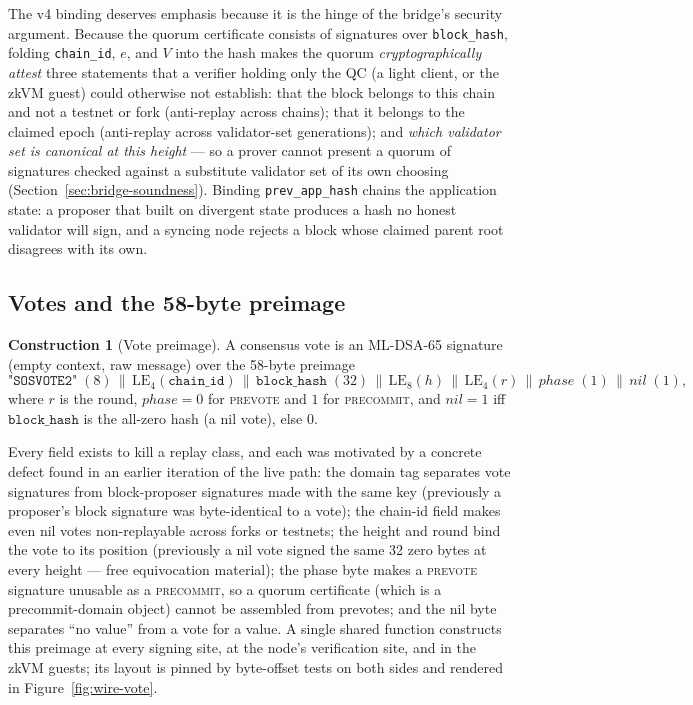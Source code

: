 \documentclass[11pt]{article}
\newcommand{\code}[1]{\texttt{#1}}
\newcommand{\mldsa}{ML\mbox{-}DSA\mbox{-}65}
\newcommand{\LE}[1]{\mathrm{LE}_{#1}}
\newcommand{\concat}{\,\|\,}
\theoremstyle{plain}
\theoremstyle{definition}
\newtheorem{construction}[theorem]{Construction}
\theoremstyle{remark}
\begin{document}
The v4 binding deserves emphasis because it is the hinge of the bridge's
security argument. Because the quorum certificate consists of signatures over
\code{block\_hash}, folding \code{chain\_id}, $e$, and $V$ into the hash makes
the quorum \emph{cryptographically attest} three statements that a verifier
holding only the QC (a light client, or the zkVM guest) could otherwise not
establish: that the block belongs to this chain and not a testnet or fork
(anti-replay across chains); that it belongs to the claimed epoch (anti-replay
across validator-set generations); and \emph{which validator set is canonical
at this height} --- so a prover cannot present a quorum of signatures checked
against a substitute validator set of its own choosing
(Section~\ref{sec:bridge-soundness}). Binding \code{prev\_app\_hash} chains
the application state: a proposer that built on divergent state produces a
hash no honest validator will sign, and a syncing node rejects a block whose
claimed parent root disagrees with its own.

\subsection{Votes and the 58-byte preimage}
\label{sec:votes}

\begin{construction}[Vote preimage]
\label{con:vote}
A consensus vote is an \mldsa{} signature (empty context, raw message) over
the 58-byte preimage
\[
\code{"SOSVOTE2"} \;(8) \concat \LE{4}(\code{chain\_id}) \concat \code{block\_hash} \;(32) \concat
\LE{8}(h) \concat \LE{4}(r) \concat \mathit{phase} \;(1) \concat
\mathit{nil} \;(1),
\]
where $r$ is the round, $\mathit{phase} = 0$ for \textsc{prevote} and $1$ for
\textsc{precommit}, and $\mathit{nil} = 1$ iff $\code{block\_hash}$ is the
all-zero hash (a nil vote), else $0$.
\end{construction}

Every field exists to kill a replay class, and each was motivated by a
concrete defect found in an earlier iteration of the live path: the domain
tag separates vote signatures from block-proposer signatures made with the
same key (previously a proposer's block signature was byte-identical to a
vote); the chain-id field makes even nil votes non-replayable across forks
or testnets; the height and round bind the vote to its position (previously a nil
vote signed the same 32 zero bytes at every height --- free equivocation
material); the phase byte makes a \textsc{prevote} signature unusable as a
\textsc{precommit}, so a quorum certificate (which is a precommit-domain
object) cannot be assembled from prevotes; and the nil byte separates
``no value'' from a vote for a value. A single shared function constructs
this preimage at every signing site, at the node's verification site, and in
the zkVM guests; its layout is pinned by byte-offset tests on both sides and
rendered in Figure~\ref{fig:wire-vote}.
\end{document}
